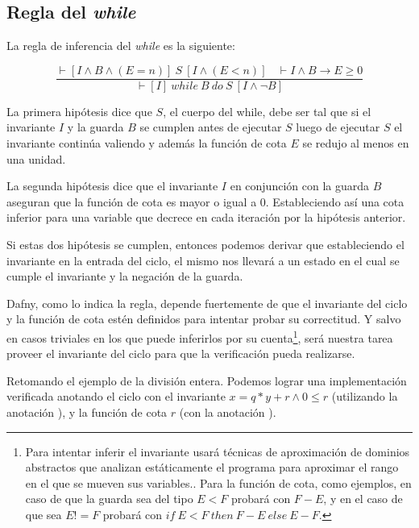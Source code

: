 \documentclass[12pt, a4paper, openany, fleqn]{book}
\newcommand{\hoareTheorem}[3]{\ensuremath{\vdash[#1]\ #2\ [#3]}}
\newcommand{\inferenceRule}[2]{
    \begin{equation*}
        \frac{#1}{#2}
    \end{equation*}
}
\begin{document}
    \vspace{1em}

    \subsection{Regla del \textit{while}}

    La regla de inferencia del \textit{while} es la siguiente:

    \inferenceRule{\hoareTheorem{I \land B \land (E = n)}{S}{I \land (E < n)}\ \ \ \ \vdash I \land B \rightarrow E \geqslant 0}{\hoareTheorem{I}{while\ B\ do\ S}{I \land \lnot B}}

    La primera hipótesis dice que $S$, el cuerpo del while, debe ser tal que si el invariante $I$ y la guarda $B$ se cumplen antes de ejecutar $S$ luego de ejecutar $S$ el invariante continúa valiendo y además la función de cota $E$ se redujo al menos en una unidad.

    La segunda hipótesis dice que el invariante $I$ en conjunción con la guarda $B$ aseguran que la función de cota es mayor o igual a 0. Estableciendo así una cota inferior para una variable que decrece en cada iteración por la hipótesis anterior.

    Si estas dos hipótesis se cumplen, entonces podemos derivar que estableciendo el invariante en la entrada del ciclo, el mismo nos llevará a un estado en el cual se cumple el invariante y la negación de la guarda.

    Dafny, como lo indica la regla, depende fuertemente de que el invariante del ciclo y la función de cota estén definidos para intentar probar su correctitud. Y salvo en casos triviales en los que puede inferirlos por su cuenta\footnote{Para intentar inferir el invariante usará técnicas de aproximación de dominios abstractos que analizan estáticamente el programa para aproximar el rango en el que se mueven sus variables.\cite{10.1007/11804192_17}. Para la función de cota, como ejemplos, en caso de que la guarda sea del tipo $E<F$ probará con $F-E$, y en el caso de que sea $E!=F$ probará con $if\ E<F\ then\ F-E\ else\ E-F$.}, será nuestra tarea proveer el invariante del ciclo para que la verificación pueda realizarse.

    Retomando el ejemplo de la división entera. Podemos lograr una implementación verificada anotando el ciclo con el invariante $x = q * y + r \land 0 \leqslant r$ (utilizando la anotación ), y la función de cota $r$ (con la anotación ).
\end{document}
